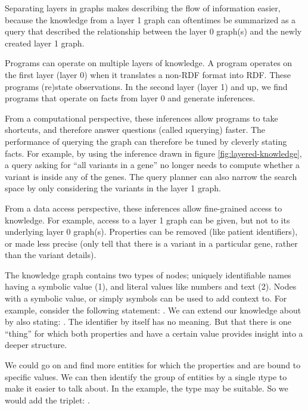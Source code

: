   Separating layers in graphs makes describing the flow of information easier,
  because the knowledge from a layer 1 graph can oftentimes be summarized as a
  query that described the relationship between the layer 0 graph(s) and the
  newly created layer 1 graph.

  Programs can operate on multiple layers of knowledge.  A program operates
  on the first layer (layer 0) when it translates a non-RDF format into RDF.
  These programs (re)state observations.  In the second layer (layer 1) and
  up, we find programs that operate on facts from layer 0 and generate
  inferences.

  From a computational perspective, these inferences allow programs to take
  shortcuts, and therefore answer questions (called \i{querying}) faster.
  The performance of querying the graph can therefore be tuned by cleverly
  stating facts.  For example, by using the inference drawn in figure
  \ref{fig:layered-knowledge}, a query asking for ``all variants in a gene''
  no longer needs to compute whether a variant is inside any of the
  genes.  The query planner can also narrow the search space by only
  considering the variants in the layer 1 graph.

  From a data access perspective, these inferences allow fine-grained access
  to knowledge.  For example, access to a layer 1 graph can be given, but
  not to its underlying layer 0 graph(s).  Properties can be removed (like
  patient identifiers), or made less precise (only tell that there is a
  variant in a particular gene, rather than the variant details).

  The knowledge graph contains two types of nodes; uniquely identifiable
  names having a symbolic value (1), and literal values like numbers and
  text (2).  Nodes with a symbolic value, or simply \i{symbols} can be used
  to add context to.  For example, consider the following statement:
  .  We can extend our knowledge
  about  by also stating: .
  The identifier  by itself has no meaning.  But that there is one
  ``thing'' for which both properties  and
   have a certain value provides insight into a
  deeper structure.

  \begin{sloppypar}
  We could go on and find more entities for which the properties
   and  are bound to
  specific values.  We can then identify the group of entities by a single
  \i{type} to make it easier to talk about.   In the example, the type
   may be suitable.  So we would add the triplet:
  .
  \end{sloppypar}
